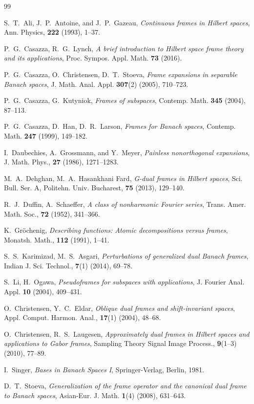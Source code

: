 \documentclass[12pt]{article}
\theoremstyle{definition}
\theoremstyle{remark}
\begin{document}
\begin{thebibliography}{99}

S.~T.~Ali, J.~P.~Antoine, and J.~P.~Gazeau, \textit{Continuous frames in Hilbert spaces}, Ann. Physics, \textbf{222} (1993), 1–37.


P.~G.~Casazza, R.~G.~Lynch, \textit{A brief introduction to Hilbert space frame theory and its applications}, Proc. Sympos. Appl. Math. \textbf{73} (2016).

P.~G.~Casazza, O.~Christensen, D.~T.~Stoeva, \textit{Frame expansions in separable Banach spaces}, J. Math. Anal. Appl. \textbf{307}(2) (2005), 710–723.

P.~G.~Casazza, G.~Kutyniok, \textit{Frames of subspaces}, Contemp. Math. \textbf{345} (2004), 87–113.

P.~G.~Casazza, D.~Han, D.~R.~Larson, \textit{Frames for Banach spaces}, Contemp. Math. \textbf{247} (1999), 149–182.

I.~Daubechies, A.~Grossmann, and Y.~Meyer, \textit{Painless nonorthogonal expansions}, J. Math. Phys., \textbf{27} (1986), 1271–1283.

M.~A.~Dehghan, M.~A.~Hasankhani Fard, \textit{G-dual frames in Hilbert spaces}, Sci. Bull. Ser. A, Politehn. Univ. Bucharest, \textbf{75} (2013), 129–140.

R.~J.~Duffin, A.~Schaeffer, \textit{A class of nonharmonic Fourier series}, Trans. Amer. Math. Soc., \textbf{72} (1952), 341–366.

K.~Gr\"{o}chenig, \textit{Describing functions: Atomic decompositions versus frames}, Monatsh. Math., \textbf{112} (1991), 1–41.

S.~S.~Karimizad, M.~S.~Asgari, \textit{Perturbations of generalized dual Banach frames}, Indian J. Sci. Technol., \textbf{7}(1) (2014), 69–78.

S.~Li, H.~Ogawa, \textit{Pseudoframes for subspaces with applications}, J. Fourier Anal. Appl. \textbf{10} (2004), 409–431.

O.~Christensen, Y.~C.~Eldar, \textit{Oblique dual frames and shift-invariant spaces}, Appl. Comput. Harmon. Anal., \textbf{17}(1) (2004), 48–68.

O.~Christensen, R.~S.~Laugesen, \textit{Approximately dual frames in Hilbert spaces and applications to Gabor frames}, Sampling Theory Signal Image Process., \textbf{9}(1–3) (2010), 77–89.

I.~Singer, \textit{Bases in Banach Spaces I}, Springer-Verlag, Berlin, 1981.

D.~T.~Stoeva, \textit{Generalization of the frame operator and the canonical dual frame to Banach spaces}, Asian-Eur. J. Math. \textbf{1}(4) (2008), 631–643.

\end{thebibliography}
\end{document}
